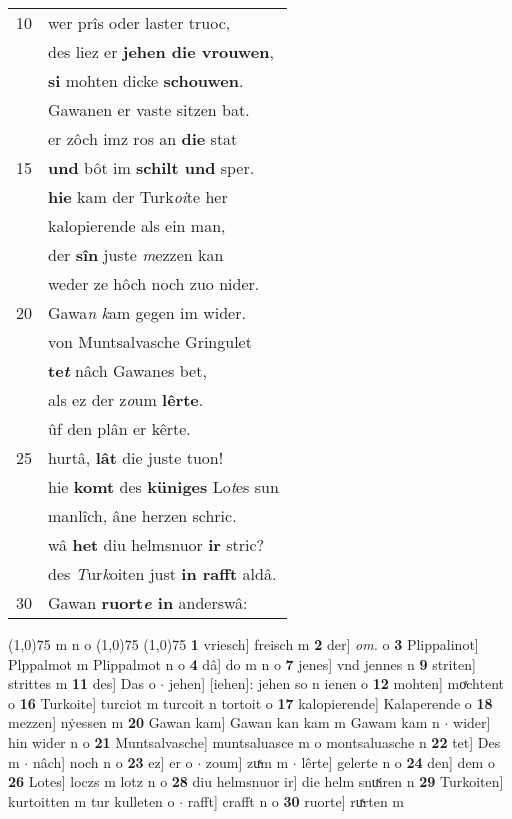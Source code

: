 \documentclass[8pt,a4paper,notitlepage]{article}
\begin{document}
\begin{table}[ht]
\begin{minipage}[t]{0.5\linewidth}
\begin{tabular}{rl}
10 & wer prîs oder laster truoc,\\ 
 & des liez er \textbf{jehen die vrouwen},\\ 
 & \textbf{si} mohten dicke \textbf{schouwen}.\\ 
 & Gawanen er vaste sitzen bat.\\ 
 & er zôch imz ros an \textbf{die} stat\\ 
15 & \textbf{und} bôt im \textbf{schilt und} sper.\\ 
 & \textbf{hie} kam der Turk\textit{oi}te her\\ 
 & kalopierende als ein man,\\ 
 & der \textbf{sîn} juste \textit{m}ezzen kan\\ 
 & weder ze hôch noch zuo nider.\\ 
20 & Gawa\textit{n} \textit{k}am gegen im wider.\\ 
 & von Muntsalvasche Gringulet\\ 
 & \textbf{te\textit{t}} nâch Gawanes bet,\\ 
 & als ez der z\textit{o}um \textbf{lêrte}.\\ 
 & ûf den plân er kêrte.\\ 
25 & hurtâ, \textbf{lât} die juste tuon!\\ 
 & hie \textbf{komt} des \textbf{küniges} Lo\textit{t}es sun\\ 
 & manlîch, âne herzen schric.\\ 
 & wâ \textbf{het} diu helmsnuor \textbf{ir} stric?\\ 
 & des \textit{T}ur\textit{k}oiten just \textbf{in rafft} aldâ.\\ 
30 & Gawan \textbf{ruort\textit{e} in} anderswâ:\\ 
\end{tabular}
\scriptsize
\line(1,0){75} \newline
m n o \newline
\line(1,0){75} \newline
\newline
\line(1,0){75} \newline
\textbf{1} vriesch] freisch m \textbf{2} der] \textit{om.} o \textbf{3} Plippalinot] Plppalmot m Plippalmot n o \textbf{4} dâ] do m n o \textbf{7} jenes] vnd jennes n \textbf{9} striten] strittes m \textbf{11} des] Das o  $\cdot$ jehen] [iehen]: jehen so n ienen o \textbf{12} mohten] moͯchtent o \textbf{16} Turkoite] turciot m turcoit n tortoit o \textbf{17} kalopierende] Kalaperende o \textbf{18} mezzen] nẏessen m \textbf{20} Gawan kam] Gawan kan kam m Gawam kam n  $\cdot$ wider] hin wider n o \textbf{21} Muntsalvasche] muntsaluasce m o montsaluasche n \textbf{22} tet] Des m  $\cdot$ nâch] noch n o \textbf{23} ez] er o  $\cdot$ zoum] zuͯm m  $\cdot$ lêrte] gelerte n o \textbf{24} den] dem o \textbf{26} Lotes] loczs m lotz n o \textbf{28} diu helmsnuor ir] die helm snuͯiren n \textbf{29} Turkoiten] kurtoitten m tur kulleten o  $\cdot$ rafft] crafft n o \textbf{30} ruorte] ruͯrten m \newline
\end{minipage}
\end{table}
\end{document}

